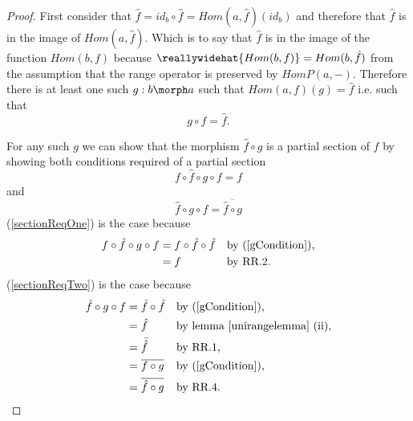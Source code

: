 \begin{proof} 
First consider that 
$\widehat{f}=id_b \circ \hat{f}=Hom(a,\hat{f})(id_b)$ 
and therefore that $\widehat{f}$ is in the image of $Hom(a,\hat{f})$.
Which is to say that $\widehat{f}$  is in the image of the function
$Hom(b,f)$ because $\reallywidehat{Hom(b,f)} = Hom(b,\hat{f})$ from the assumption that the range operator is preserved by $HomP(a,-)$. Therefore there is
at least one such $g: b \morph a$ such that $Hom(a,f)(g) = \hat{f}$ i.e. such
that
\begin{equation}
\label{gCondition}
g \circ f = \hat{f}.
\end{equation}

For any such $g$ we can show that the morphism $\hat{f} \circ g$ is a partial section of $f$
by showing  both conditions required of a partial section 
\begin{equation}
\label{sectionReqOne}
f \circ \hat{f} \circ g \circ f = f
\end{equation}  
and
\begin{equation}
\label{sectionReqTwo}
\hat{f} \circ g \circ f = \overline{\hat{f} \circ g}
\end{equation}
(\ref{sectionReqOne}) is the case because
\begin{align*}
f \circ \hat{f} \circ g \circ f &=  f \circ \hat{f} \circ \hat{f}     
                                               && \mbox{by (\ref{gCondition}),} \\
                                &=f       
                                               && \mbox{by RR.2.} 
\end{align*}
(\ref{sectionReqTwo}) is the case because
\begin{align*}
\hat{f} \circ g \circ f  &= \hat{f} \circ \hat{f}       
                                               && \mbox{by (\ref{gCondition}),} \\
                         &= \hat{f}     
                                               && \mbox{by lemma \ref{unirangelemma} (ii),} \\
                         &= \bar{\hat{f}}     
                                               && \mbox{by RR.1,} \\
                         &= \overline{f \circ g}    
                                               && \mbox{by (\ref{gCondition}),}\\
                         &= \overline{\hat{f} \circ g}     
                                               && \mbox{by RR.4.} \\
\end{align*}
\end{proof}

